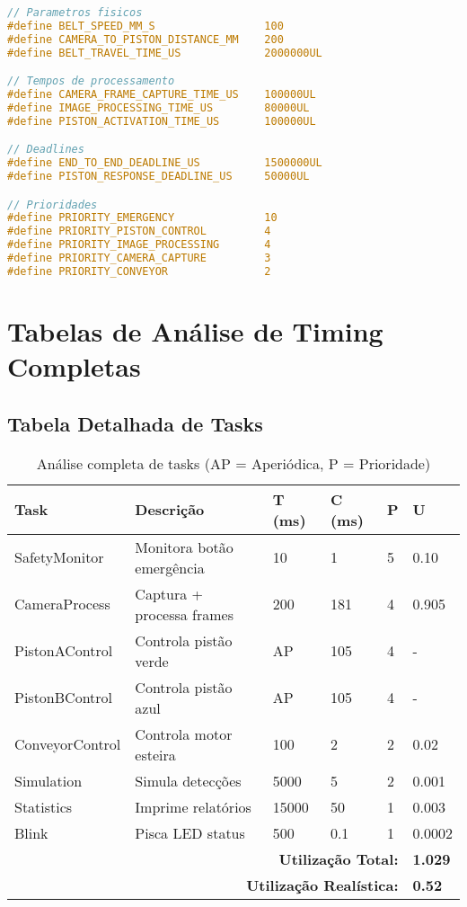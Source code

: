 \documentclass[12pt,a4paper]{article}
\begin{document}
\begin{lstlisting}[language=C, caption={Configurações de timing}]
// Parametros fisicos
#define BELT_SPEED_MM_S                 100
#define CAMERA_TO_PISTON_DISTANCE_MM    200
#define BELT_TRAVEL_TIME_US             2000000UL

// Tempos de processamento
#define CAMERA_FRAME_CAPTURE_TIME_US    100000UL
#define IMAGE_PROCESSING_TIME_US        80000UL
#define PISTON_ACTIVATION_TIME_US       100000UL

// Deadlines
#define END_TO_END_DEADLINE_US          1500000UL
#define PISTON_RESPONSE_DEADLINE_US     50000UL

// Prioridades
#define PRIORITY_EMERGENCY              10
#define PRIORITY_PISTON_CONTROL         4
#define PRIORITY_IMAGE_PROCESSING       4
#define PRIORITY_CAMERA_CAPTURE         3
#define PRIORITY_CONVEYOR               2
\end{lstlisting}

\section{Tabelas de Análise de Timing Completas}

\subsection{Tabela Detalhada de Tasks}

\begin{table}[H]
\centering
\small
\begin{tabularx}{\textwidth}{lXllll}
\toprule
\textbf{Task} & \textbf{Descrição} & \textbf{T (ms)} & \textbf{C (ms)} & \textbf{P} & \textbf{U} \\
\midrule
SafetyMonitor & Monitora botão emergência & 10 & 1 & 5 & 0.10 \\
CameraProcess & Captura + processa frames & 200 & 181 & 4 & 0.905 \\
PistonAControl & Controla pistão verde & AP & 105 & 4 & - \\
PistonBControl & Controla pistão azul & AP & 105 & 4 & - \\
ConveyorControl & Controla motor esteira & 100 & 2 & 2 & 0.02 \\
Simulation & Simula detecções & 5000 & 5 & 2 & 0.001 \\
Statistics & Imprime relatórios & 15000 & 50 & 1 & 0.003 \\
Blink & Pisca LED status & 500 & 0.1 & 1 & 0.0002 \\
\midrule
\multicolumn{5}{r}{\textbf{Utilização Total:}} & \textbf{1.029} \\
\multicolumn{5}{r}{\textbf{Utilização Realística:}} & \textbf{0.52} \\
\bottomrule
\end{tabularx}
\caption{Análise completa de tasks (AP = Aperiódica, P = Prioridade)}
\end{table}
\end{document}
